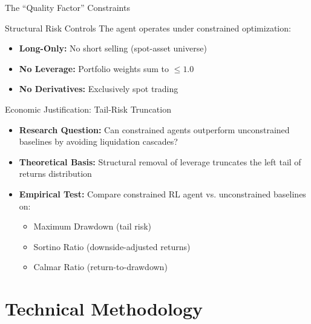 \documentclass[aspectratio=169]{beamer}
\begin{document}
\begin{frame}{The ``Quality Factor'' Constraints}
\begin{block}{Structural Risk Controls}
The agent operates under \alert{constrained optimization}:
\begin{itemize}
    \item \textbf{Long-Only:} No short selling (spot-asset universe)
    \item \textbf{No Leverage:} Portfolio weights sum to $\leq 1.0$
    \item \textbf{No Derivatives:} Exclusively spot trading
\end{itemize}
\end{block}

\vspace{0.5cm}

\begin{block}{Economic Justification: Tail-Risk Truncation}
\begin{itemize}
    \item \textbf{Research Question:} Can constrained agents outperform unconstrained baselines by avoiding \alert{liquidation cascades}?
    \item \textbf{Theoretical Basis:} Structural removal of leverage truncates the left tail of returns distribution
    \item \textbf{Empirical Test:} Compare constrained RL agent vs. unconstrained baselines on:
    \begin{itemize}
        \item Maximum Drawdown (tail risk)
        \item Sortino Ratio (downside-adjusted returns)
        \item Calmar Ratio (return-to-drawdown)
    \end{itemize}
\end{itemize}
\end{block}
\end{frame}


\section{Technical Methodology}
\end{document}
